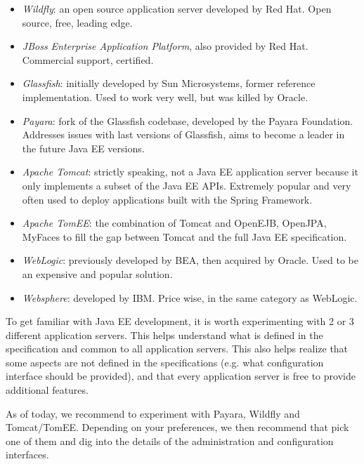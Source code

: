 \begin{itemize}
\item \emph{Wildfly}: an open source application server developed by Red Hat. Open source, free, leading edge.
\item \emph{JBoss Enterprise Application Platform}, also provided by Red Hat. Commercial support, certified.
\item \emph{Glassfish}: initially developed by Sun Microsystems, former reference implementation. Used to work very well, but was killed by Oracle.
\item \emph{Payara}: fork of the Glassfish codebase, developed by the Payara Foundation. Addresses issues with last versions of Glassfish, aims to become a leader in the future Java EE versions.
\item \emph{Apache Tomcat}: strictly speaking, not a Java EE application server because it only implements a subset of the Java EE APIs. Extremely popular and very often used to deploy applications built with the Spring Framework.
\item \emph{Apache TomEE}: the combination of Tomcat and OpenEJB, OpenJPA, MyFaces to fill the gap between Tomcat and the full Java EE specification.
\item \emph{WebLogic}: previously developed by BEA, then acquired by Oracle. Used to be an expensive and popular solution. 
\item \emph{Websphere}: developed by IBM. Price wise, in the same category as WebLogic.
\end{itemize}


To get familiar with Java EE development, it is worth experimenting with 2 or 3 different application servers. This helps understand what is defined in the specification and common to all application servers. This also helps realize that some aspects are not defined in the specifications (e.g. what configuration interface should be provided), and that every application server is free to provide additional features.

As of today, we recommend to experiment with Payara, Wildfly and Tomcat/TomEE. Depending on your preferences, we then recommend that pick one of them and dig into the details of the administration and configuration interfaces.

